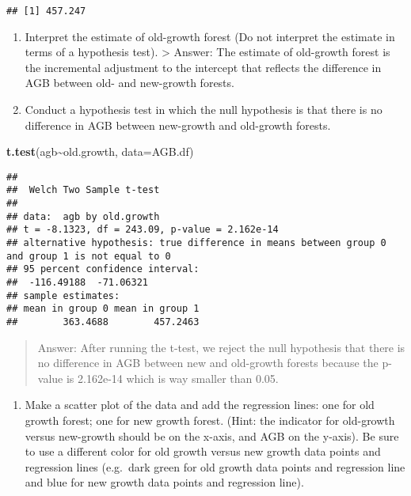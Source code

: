 \documentclass[
]{article}
\newenvironment{Shaded}{\begin{snugshade}}{\end{snugshade}}
\newcommand{\AttributeTok}[1]{\textcolor[rgb]{0.13,0.29,0.53}{#1}}
\newcommand{\FunctionTok}[1]{\textcolor[rgb]{0.13,0.29,0.53}{\textbf{#1}}}
\newcommand{\NormalTok}[1]{#1}
\newcommand{\SpecialCharTok}[1]{\textcolor[rgb]{0.81,0.36,0.00}{\textbf{#1}}}
\providecommand{\tightlist}{%
  \setlength{\itemsep}{0pt}\setlength{\parskip}{0pt}}
\begin{document}
\begin{verbatim}
## [1] 457.247
\end{verbatim}

\begin{enumerate}
\def\labelenumi{\alph{enumi}.}
\setcounter{enumi}{3}
\item
  Interpret the estimate of old-growth forest (Do not interpret the
  estimate in terms of a hypothesis test). \textgreater{} Answer: The
  estimate of old-growth forest is the incremental adjustment to the
  intercept that reflects the difference in AGB between old- and
  new-growth forests.
\item
  Conduct a hypothesis test in which the null hypothesis is that there
  is no difference in AGB between new-growth and old-growth forests.
\end{enumerate}

\begin{Shaded}
\begin{Highlighting}[]
\FunctionTok{t.test}\NormalTok{(agb}\SpecialCharTok{\textasciitilde{}}\NormalTok{old.growth, }\AttributeTok{data=}\NormalTok{AGB.df)}
\end{Highlighting}
\end{Shaded}

\begin{verbatim}
## 
##  Welch Two Sample t-test
## 
## data:  agb by old.growth
## t = -8.1323, df = 243.09, p-value = 2.162e-14
## alternative hypothesis: true difference in means between group 0 and group 1 is not equal to 0
## 95 percent confidence interval:
##  -116.49188  -71.06321
## sample estimates:
## mean in group 0 mean in group 1 
##        363.4688        457.2463
\end{verbatim}

\begin{quote}
Answer: After running the t-test, we reject the null hypothesis that
there is no difference in AGB between new and old-growth forests because
the p-value is 2.162e-14 which is way smaller than 0.05.
\end{quote}

\begin{enumerate}
\def\labelenumi{\alph{enumi}.}
\setcounter{enumi}{5}
\tightlist
\item
  Make a scatter plot of the data and add the regression lines: one for
  old growth forest; one for new growth forest. (Hint: the indicator for
  old-growth versus new-growth should be on the x-axis, and AGB on the
  y-axis). Be sure to use a different color for old growth versus new
  growth data points and regression lines (e.g.~dark green for old
  growth data points and regression line and blue for new growth data
  points and regression line).
\end{enumerate}
\end{document}
